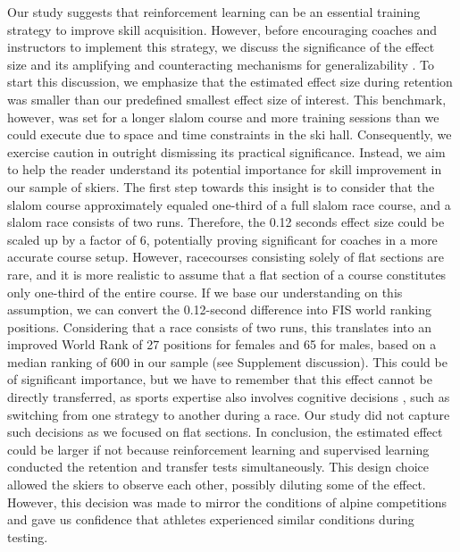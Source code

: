 \documentclass{article}
\begin{document}
Our study suggests that reinforcement learning can be an essential training strategy to improve skill acquisition. However, before encouraging coaches and instructors to implement this strategy, we discuss the significance of the effect size and its amplifying and counteracting mechanisms for generalizability \cite{anvari_not_2023}. To start this discussion, we emphasize that the estimated effect size during retention was smaller than our predefined smallest effect size of interest. This benchmark, however, was set for a longer slalom course and more training sessions than we could execute due to space and time constraints in the ski hall. Consequently, we exercise caution in outright dismissing its practical significance. Instead, we aim to help the reader understand its potential importance for skill improvement in our sample of skiers. The first step towards this insight is to consider that the slalom course approximately equaled one-third of a full slalom race course, and a slalom race consists of two runs. Therefore, the 0.12 seconds effect size could be scaled up by a factor of 6, potentially proving significant for coaches in a more accurate course setup. However, racecourses consisting solely of flat sections are rare, and it is more realistic to assume that a flat section of a course constitutes only one-third of the entire course. If we base our understanding on this assumption, we can convert the 0.12-second difference into FIS world ranking positions. Considering that a race consists of two runs, this translates into an improved World Rank of 27 positions for females and 65 for males, based on a median ranking of 600 in our sample (see Supplement discussion). This could be of significant importance, but we have to remember that this effect cannot be directly transferred, as sports expertise also involves cognitive decisions \cite{mangalam_investigating_2023, krakauer_motor_2019}, such as switching from one strategy to another during a race. Our study did not capture such decisions as we focused on flat sections. In conclusion, the estimated effect could be larger if not because reinforcement learning and supervised learning conducted the retention and transfer tests simultaneously. This design choice allowed the skiers to observe each other, possibly diluting some of the effect. However, this decision was made to mirror the conditions of alpine competitions and gave us confidence that athletes experienced similar conditions during testing. 
\end{document}

